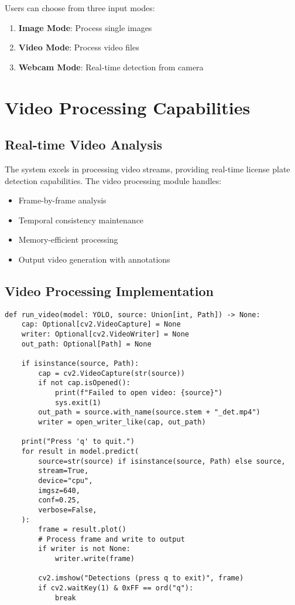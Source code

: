 \documentclass[12pt,a4paper]{article}
\begin{document}
Users can choose from three input modes:
\begin{enumerate}
    \item \textbf{Image Mode}: Process single images
    \item \textbf{Video Mode}: Process video files
    \item \textbf{Webcam Mode}: Real-time detection from camera
\end{enumerate}

\section{Video Processing Capabilities}

\subsection{Real-time Video Analysis}

The system excels in processing video streams, providing real-time license plate detection capabilities. The video processing module handles:

\begin{itemize}
    \item Frame-by-frame analysis
    \item Temporal consistency maintenance
    \item Memory-efficient processing
    \item Output video generation with annotations
\end{itemize}

\subsection{Video Processing Implementation}

\begin{lstlisting}[caption=Video Processing Function]
def run_video(model: YOLO, source: Union[int, Path]) -> None:
    cap: Optional[cv2.VideoCapture] = None
    writer: Optional[cv2.VideoWriter] = None
    out_path: Optional[Path] = None

    if isinstance(source, Path):
        cap = cv2.VideoCapture(str(source))
        if not cap.isOpened():
            print(f"Failed to open video: {source}")
            sys.exit(1)
        out_path = source.with_name(source.stem + "_det.mp4")
        writer = open_writer_like(cap, out_path)

    print("Press 'q' to quit.")
    for result in model.predict(
        source=str(source) if isinstance(source, Path) else source,
        stream=True,
        device="cpu",
        imgsz=640,
        conf=0.25,
        verbose=False,
    ):
        frame = result.plot()
        # Process frame and write to output
        if writer is not None:
            writer.write(frame)
        
        cv2.imshow("Detections (press q to exit)", frame)
        if cv2.waitKey(1) & 0xFF == ord("q"):
            break
\end{lstlisting}
\end{document}
